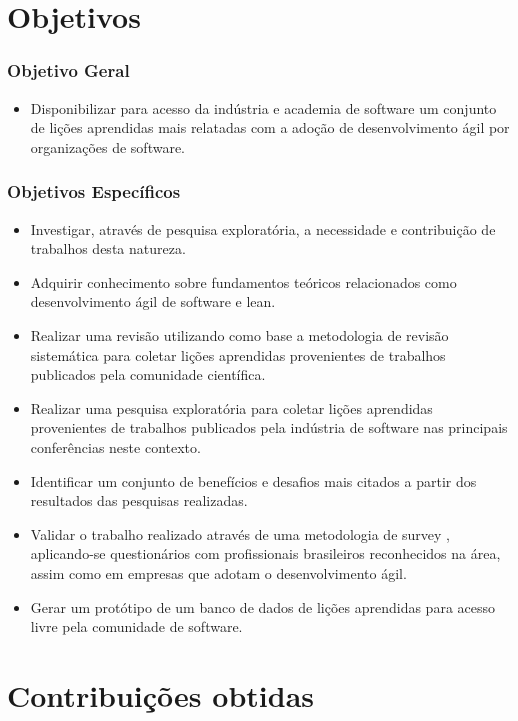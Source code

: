 \section{Objetivos} 

\subsubsection{Objetivo Geral}

\begin{itemize}
	\item Disponibilizar para acesso da indústria e academia de software um conjunto de lições aprendidas mais relatadas com a adoção de desenvolvimento ágil por organizações de software.
\end{itemize}

\subsubsection{Objetivos Específicos}

\begin{itemize}
	\item Investigar, através de pesquisa exploratória, a necessidade e contribuição de trabalhos desta natureza.
	\item Adquirir conhecimento sobre fundamentos teóricos relacionados como desenvolvimento ágil de software e lean.
	\item Realizar uma revisão utilizando como base a metodologia de revisão sistemática \cite{Barbara2004} para coletar lições aprendidas provenientes de trabalhos publicados pela comunidade científica.
	\item Realizar uma pesquisa exploratória para coletar lições aprendidas provenientes de trabalhos publicados pela indústria de software nas principais conferências neste contexto.
	\item Identificar um conjunto de benefícios e desafios mais citados a partir dos resultados das pesquisas realizadas.
	\item Validar o trabalho realizado através de uma metodologia de survey \cite{Babbie1990}, aplicando-se questionários com profissionais brasileiros reconhecidos na área, assim como em empresas que adotam o desenvolvimento ágil.
	\item Gerar um protótipo de um banco de dados de lições aprendidas para acesso livre pela comunidade de software.
\end{itemize}

\section{Contribuições obtidas}

